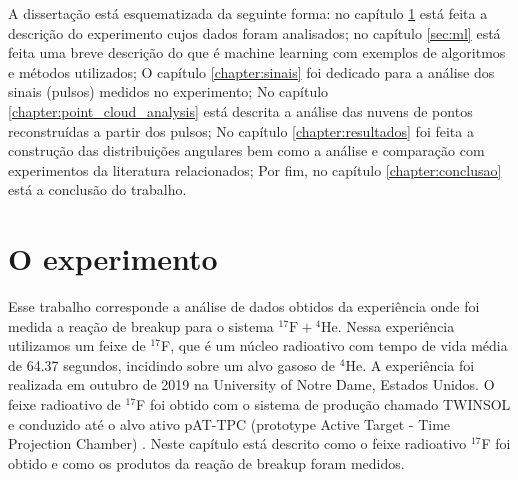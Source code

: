\documentclass[a4paper,12pt,oneside]{book}
\begin{document}
\par A dissertação está esquematizada da seguinte forma: no capítulo \ref{PATTPC} está feita a descrição do experimento cujos dados foram analisados; no capítulo \ref{sec:ml} está feita uma breve descrição do que é machine learning com exemplos de algoritmos e métodos utilizados; O capítulo \ref{chapter:sinais} foi dedicado para a análise dos sinais (pulsos) medidos no experimento; No capítulo \ref{chapter:point_cloud_analysis} está descrita a análise das nuvens de pontos reconstruídas a partir dos pulsos; No capítulo \ref{chapter:resultados} foi feita a construção das distribuições angulares bem como a análise e comparação com experimentos da literatura relacionados; Por fim, no capítulo \ref{chapter:conclusao} está a conclusão do trabalho.

\chapter{O experimento}\label{PATTPC}


\par Esse trabalho corresponde a análise de dados obtidos da experiência onde foi medida a reação de breakup para o sistema ${}^{17}\mathrm{F}+{}^{4}\mathrm{He}$. Nessa experiência utilizamos um feixe de $^{17}$F, que é um núcleo radioativo com tempo de vida média de 64.37 segundos, incidindo sobre um alvo gasoso de $^{4}$He. A experiência foi realizada em outubro de 2019 na University of Notre Dame, Estados Unidos. O feixe radioativo de $^{17}$F foi obtido com o sistema de produção chamado TWINSOL \cite{twinsol} e conduzido até o alvo ativo pAT-TPC (prototype Active Target - Time Projection Chamber) \cite{pattpc}. Neste capítulo está descrito como o feixe radioativo ${}^{17}$F foi obtido e como os produtos da reação de breakup foram medidos.

\end{document}
